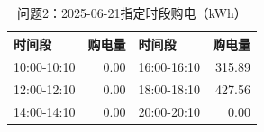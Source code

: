 \begin{table}[H]\centering\small\caption{问题2：2025-06-21指定时段购电（kWh）}\label{tab:q220250621p}
\begin{tabular}{lrlr}\toprule
时间段 & 购电量 & 时间段 & 购电量\\\midrule
10:00-10:10 & 0.00 & 16:00-16:10 & 315.89\\
12:00-12:10 & 0.00 & 18:00-18:10 & 427.56\\
14:00-14:10 & 0.00 & 20:00-20:10 & 0.00\\
\bottomrule\end{tabular}\end{table}
